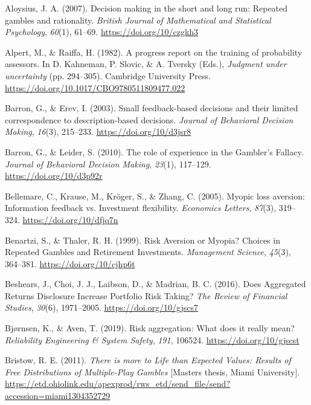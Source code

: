 \documentclass[
  english,
  man, donotrepeattitle,floatsintext]{apa7}
\newlength{\cslhangindent}
\newenvironment{cslreferences}%
  {\setlength{\parindent}{0pt}%
  \everypar{\setlength{\hangindent}{\cslhangindent}}\ignorespaces}%
  {\par}
\theoremstyle{definition}
\theoremstyle{definition}
\theoremstyle{definition}
\theoremstyle{definition}
\theoremstyle{remark}
\begin{document}
\hypertarget{refs}{}
\begin{cslreferences}
\leavevmode\hypertarget{ref-aloysius2007}{}%
Aloysius, J. A. (2007). Decision making in the short and long run: Repeated gambles and rationality. \emph{British Journal of Mathematical and Statistical Psychology}, \emph{60}(1), 61--69. \url{https://doi.org/10/czgkh3}

\leavevmode\hypertarget{ref-alpert1982}{}%
Alpert, M., \& Raiffa, H. (1982). A progress report on the training of probability assessors. In D. Kahneman, P. Slovic, \& A. Tversky (Eds.), \emph{Judgment under uncertainty} (pp. 294--305). Cambridge University Press. \url{https://doi.org/10.1017/CBO9780511809477.022}

\leavevmode\hypertarget{ref-barron2003}{}%
Barron, G., \& Erev, I. (2003). Small feedback-based decisions and their limited correspondence to description-based decisions. \emph{Journal of Behavioral Decision Making}, \emph{16}(3), 215--233. \url{https://doi.org/10/d3jsr8}

\leavevmode\hypertarget{ref-barron2010}{}%
Barron, G., \& Leider, S. (2010). The role of experience in the Gambler's Fallacy. \emph{Journal of Behavioral Decision Making}, \emph{23}(1), 117--129. \url{https://doi.org/10/d3p92r}

\leavevmode\hypertarget{ref-bellemare2005}{}%
Bellemare, C., Krause, M., Kröger, S., \& Zhang, C. (2005). Myopic loss aversion: Information feedback vs. Investment flexibility. \emph{Economics Letters}, \emph{87}(3), 319--324. \url{https://doi.org/10/dfjq7n}

\leavevmode\hypertarget{ref-benartzi1999}{}%
Benartzi, S., \& Thaler, R. H. (1999). Risk Aversion or Myopia? Choices in Repeated Gambles and Retirement Investments. \emph{Management Science}, \emph{45}(3), 364--381. \url{https://doi.org/10/cjhp6t}

\leavevmode\hypertarget{ref-beshears2016}{}%
Beshears, J., Choi, J. J., Laibson, D., \& Madrian, B. C. (2016). Does Aggregated Returns Disclosure Increase Portfolio Risk Taking? \emph{The Review of Financial Studies}, \emph{30}(6), 1971--2005. \url{https://doi.org/10/gjscs7}

\leavevmode\hypertarget{ref-bjornsen2019}{}%
Bjørnsen, K., \& Aven, T. (2019). Risk aggregation: What does it really mean? \emph{Reliability Engineering \& System Safety}, \emph{191}, 106524. \url{https://doi.org/10/gjscst}

\leavevmode\hypertarget{ref-bristow2011}{}%
Bristow, R. E. (2011). \emph{There is more to Life than Expected Values: Results of Free Distributions of Multiple-Play Gambles} {[}Masters thesis, Miami University{]}. \url{https://etd.ohiolink.edu/apexprod/rws_etd/send_file/send?accession=miami1304352729}


\end{cslreferences}
\end{document}
